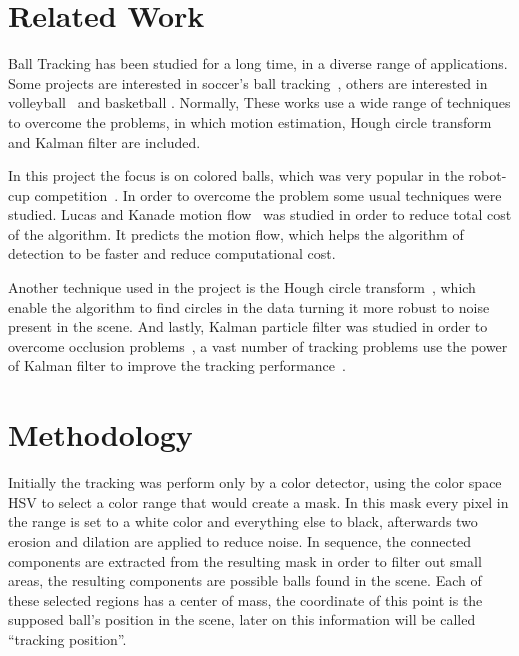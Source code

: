 \documentclass[10pt,twocolumn,letterpaper]{article}
\begin{document}
\section{Related Work}\label{sec:work}

Ball Tracking has been studied for a long time, in a diverse range of applications.  Some projects  are interested in soccer's ball tracking~\cite{seo1997ball,  tong2004effective, choi2004probabilistic}, others are interested in  volleyball~\cite{chen2007physics} and basketball \cite{ maksai2016players}.   Normally, These works use a wide range of techniques to overcome the problems,  in which motion estimation, Hough circle transform and Kalman filter are included.

In this project the focus is on colored balls, which was very popular in the robot-cup competition~\cite{kitano1997robocup, simon2000robust, kitano1998robocup}.  In order to overcome the problem some usual techniques were studied. Lucas and Kanade motion flow~\cite{tomasi1992shape, tomasi1991detection} was studied in order to reduce total cost of the algorithm.  It predicts the motion flow, which helps the algorithm of detection to be faster and reduce computational cost.

Another technique used in the project is the Hough circle transform~\cite{illingworth1987adaptive}, which enable  the algorithm to find circles in the data turning it more robust to noise present in the scene. And lastly, Kalman particle filter was studied in order to overcome occlusion problems~\cite{ristic2004beyond}, a vast number of tracking problems use the power of Kalman filter to improve the tracking performance~\cite{satoh2004color}.


\section{Methodology}\label{sec:method}

Initially the tracking was perform only by a color detector, using the color space HSV to select a color range that would create a mask. In this mask every pixel in the range is set to a white color and everything else to black, afterwards two erosion and dilation are applied to reduce noise. In sequence, the connected components are extracted from the resulting mask in order to filter out small areas, the resulting components are possible balls found in the scene. Each of these selected regions has a center of mass, the coordinate of this point is the supposed ball's position in the scene, later on this information will be called ``tracking position''.
\end{document}
